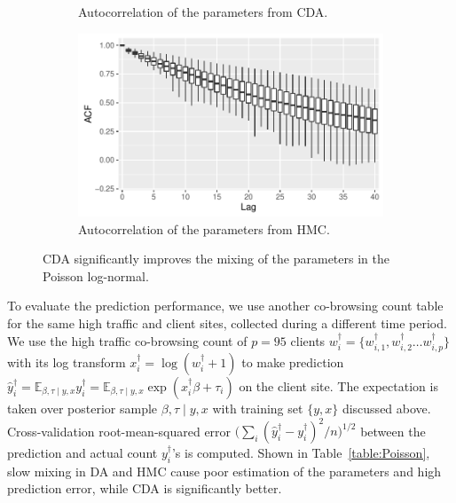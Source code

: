 \documentclass[10pt]{article}
\newcommand{\bb}[1]{\mathbb{#1}}
\begin{document}
\begin{figure}[H]
\begin{subfigure}[b]{0.32\textwidth}
 \caption{Autocorrelation of the parameters from CDA.}
 \end{subfigure}  \hfill 
 \begin{subfigure}[b]{0.32\textwidth}
 \includegraphics[width=1\textwidth]{poisson_acf_hmc}
 \caption{Autocorrelation of the parameters from HMC.}
 \end{subfigure}
 \caption{CDA significantly improves the mixing of the parameters in the Poisson log-normal.}
 \label{data_poisson}
 \end{figure}



To evaluate the prediction performance, we use another co-browsing count table for the same high traffic and client sites, collected during a different time period. We use the high traffic co-browsing count of $p= 95$ clients $ w_i^\dagger = \{  w_{i,1}^\dagger,  w_{i,2}^\dagger \ldots  w_{i,p}^\dagger \}$ with its log transform $  x^\dagger_{i} = \log(   w_{i}^\dagger +1 )$ to make prediction $\hat y_i^\dagger= \bb E_{ \beta, \tau \mid y,x}   y_{i}^\dagger =\bb E_{ \beta, \tau \mid y,x}\exp(  x_{i}^\dagger\beta + \tau_i)$ on the client site. The expectation is taken over posterior sample $\beta, \tau \mid y,x$ with training set $\{y,x\}$ discussed above. Cross-validation root-mean-squared error $\big(\sum_i(\hat y_i^\dagger - y_i^\dagger)^2/n\big)^{1/2}$ between the prediction and actual count $ y_i^\dagger$'s is computed. Shown in Table~\ref{table:Poisson}, slow mixing in DA and HMC cause poor estimation of the parameters and high prediction error, while CDA is significantly better. 
\end{document}
